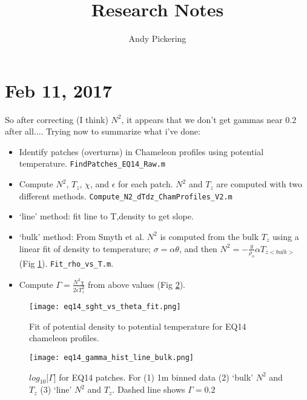 \documentclass[11pt]{article}
\title{Research Notes}
\author{Andy Pickering}
\begin{document}
\maketitle

\tableofcontents
\newpage






\clearpage
\section{Feb 11, 2017}

So after correcting (I think) $N^2$, it appears that we don't get gammas near 0.2 after all.... Trying now to summarize what i've done:

\begin{itemize}
\item Identify patches (overturns) in Chameleon profiles using potential temperature. \verb+FindPatches_EQ14_Raw.m+
\item Compute $N^2$, $T_z$, $\chi$, and $\epsilon$ for each patch. $N^2$ and $T_z$ are computed with two different methods. \verb+Compute_N2_dTdz_ChamProfiles_V2.m+
\item `line' method: fit line to T,density to get slope.
\item `bulk' method: From Smyth et al. $N^2$ is computed from the bulk $T_z$ using a linear fit of density to temperature; $\sigma=\alpha \theta$, and then $N^2=-\frac{g}{\rho_o} \alpha T_{z <bulk>}$
 (Fig \ref{sgth_theta_fit}). \verb+Fit_rho_vs_T.m+.
\item Compute $\Gamma=\frac{N^2\chi}{2\epsilon T_{z}^{2}}$ from above values (Fig \ref{gamshist}).
\end{itemize}


\begin{figure}[htbp]
\texttt{[image: eq14\_sght\_vs\_theta\_fit.png]}
\caption{Fit of potential density to potential temperature for EQ14 chameleon profiles.}
\label{sgth_theta_fit}
\end{figure}



\begin{figure}[htbp]
\texttt{[image: eq14\_gamma\_hist\_line\_bulk.png]}
\caption{$log_{10}[\Gamma$] for EQ14 patches. For (1) 1m binned data (2) `bulk' $N^2$ and $T_z$ (3) `line' $N^2$ and $T_z$. Dashed line shows $\Gamma=0.2$}
\label{gamshist}
\end{figure}
\end{document}

